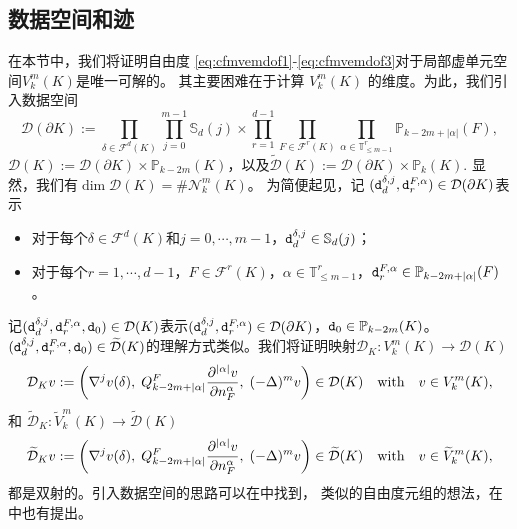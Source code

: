 \subsection{数据空间和迹}\label{subsec:dataspacetrace}
在本节中，我们将证明自由度 
\eqref{eq:cfmvemdof1}-\eqref{eq:cfmvemdof3}对于局部虚单元空间$V_k^m(K)$是唯一可解的。
其主要困难在于计算 $V_k^m(K)$ 的维度。为此，我们引入数据空间
$$
\mathcal D(\partial K):=\prod_{\delta\in\mathcal F^d(K)}\prod_{j=0}^{m-1}\mathbb
S_d(j) \times \prod_{r=1}^{d-1}\prod_{F\in\mathcal F^r(K)}\prod_{\alpha\in
\mathbb{T}^r_{\leq m-1}}\mathbb P_{k-2m+|\alpha|}(F),
$$
$
\mathcal D(K):=\mathcal D(\partial K)\times\mathbb P_{k-2m}(K)$，以及$\widetilde{\mathcal D}(K):=\mathcal D(\partial K)\times\mathbb P_{k}(K).
$
显然，我们有$\dim\mathcal D(K)=\#\mathcal N_k^m(K)$。
为简便起见，记 $(\textnormal{\texttt{d}}_{d}^{\delta, j}, \textnormal{\texttt{d}}_{r}^{F, \alpha})\in\mathcal D(\partial K)$表示
\begin{itemize}
\item 对于每个$\delta\in\mathcal F^d(K)$和$j=0,\cdots,m-1$，$\textnormal{\texttt{d}}_{d}^{\delta, j}\in\mathbb S_d(j)$；
\item 对于每个$r=1,\cdots, d-1$，$F\in\mathcal F^r(K)$，$\alpha\in \mathbb{T}^r_{\leq
    m-1}$，$\textnormal{\texttt{d}}_{r}^{F, \alpha}\in\mathbb P_{k-2m+|\alpha|}(F)$。
\end{itemize}
记$(\textnormal{\texttt{d}}_{d}^{\delta, j}, \textnormal{\texttt{d}}_{r}^{F, \alpha}, \textnormal{\texttt{d}}_0)\in\mathcal
D(K)$表示$(\textnormal{\texttt{d}}_{d}^{\delta, j}, \textnormal{\texttt{d}}_{r}^{F, \alpha})\in\mathcal D(\partial
K)$，$\textnormal{\texttt{d}}_0\in\mathbb P_{k-2m}(K)$。$(\textnormal{\texttt{d}}_{d}^{\delta, j}, \textnormal{\texttt{d}}_{r}^{F,
\alpha}, \textnormal{\texttt{d}}_0)\in\widetilde{\mathcal
D}(K)$的理解方式类似。我们将证明映射$\mathcal D_K: V_k^m(K)\to\mathcal D(K)$ 
$$
\mathcal D_Kv:=\left(\nabla^{j}v(\delta),\; Q_{k-2m+|\alpha|}^F\frac{\partial^{|\alpha|}v}{\partial n_F^{\alpha}},\; (-\Delta)^mv\right) \in \mathcal D(K) \quad\textrm{with}\quad v\in V_k^m(K),
$$
和 $\widetilde{\mathcal D}_K: \widetilde{V}_k^m(K)\to\widetilde{\mathcal D}(K)$
$$
\widetilde{\mathcal D}_Kv:=\bigg(\nabla^{j}v(\delta),\; Q_{k-2m+|\alpha|}^F\frac{\partial^{|\alpha|}v}{\partial n_F^{\alpha}},\; (-\Delta)^mv\bigg) \in \widetilde{\mathcal D}(K) \quad\textrm{with}\quad v\in \widetilde{V}_k^m(K),
$$
都是双射的。引入数据空间的思路可以在\cite{ChenHuang2022}中找到，
类似的自由度元组的想法，在\cite{AntoniettiManziniScacchiVerani2021}中也有提出。


